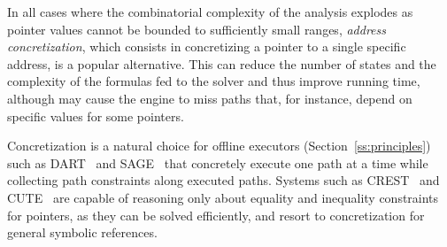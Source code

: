 In all cases where the combinatorial complexity of the analysis explodes as pointer values cannot be bounded to sufficiently small ranges, {\em address concretization}, which consists in concretizing a pointer to a single specific address, is a popular alternative. This can reduce the number of states and the complexity of the formulas fed to the solver and thus improve running time, although may cause the engine to miss paths that, for instance, depend on specific values for some pointers. 

Concretization is a natural choice for offline executors (Section~\ref{ss:principles}) such as {\sc DART}~\cite{DART-PLDI05} and {\sc SAGE}~\cite{SAGE-NDSS08} that concretely execute one path at a time while collecting path constraints along executed paths. Systems such as {\sc CREST}~\cite{CREST-ASE08} and {\sc CUTE}~\cite{CUTE-FSE13} are capable of reasoning only about equality and inequality constraints for pointers, as they can be solved efficiently, and resort to concretization for general symbolic references.







